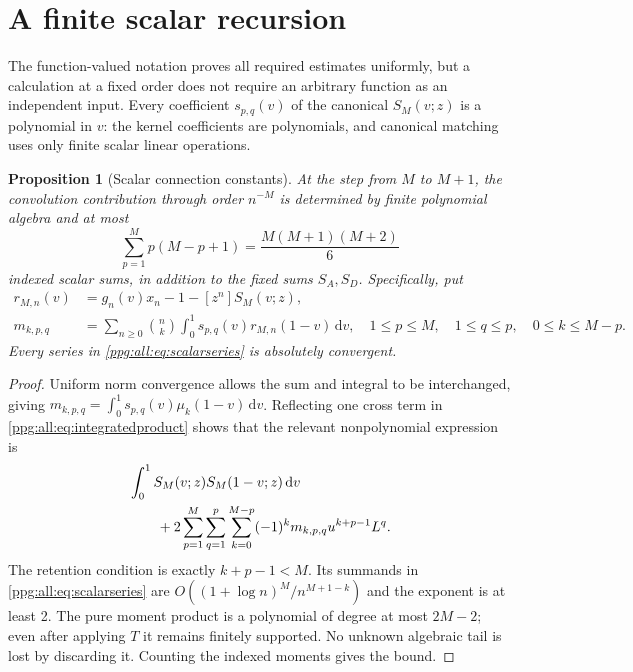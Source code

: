 \documentclass[11pt,letterpaper]{article}
\newtheorem{proposition}[theorem]{Proposition}
\theoremstyle{remark}\newtheorem{remark}[theorem]{Remark}
\numberwithin{equation}{section}
\newcommand{\dd}{\mathrm d}
\begin{document}
\section{A finite scalar recursion}\label{ppg:all:sec:scalar}
The function-valued notation proves all required estimates uniformly, but a calculation at a fixed order does not require an arbitrary function as an independent input. Every coefficient $s_{p,q}(v)$ of the canonical $S_M(v;z)$ is a polynomial in $v$: the kernel coefficients are polynomials, and canonical matching uses only finite scalar linear operations.

\begin{proposition}[Scalar connection constants]\label{ppg:all:prop:scalar}
At the step from $M$ to $M+1$, the convolution contribution through order $n^{-M}$ is determined by finite polynomial algebra and at most
\[
 \sum_{p=1}^M p(M-p+1)=\frac{M(M+1)(M+2)}6
\]
indexed scalar sums, in addition to the fixed sums $S_A,S_D$. Specifically, put
\begin{align}
 r_{M,n}(v)&=g_n(v)x_n-1-[z^n]S_M(v;z),\label{ppg:all:eq:rMn}\\
 m_{k,p,q}&=\sum_{n\ge0}\binom nk\int_0^1s_{p,q}(v)r_{M,n}(1-v)\,\dd v,
 \quad 1\le p\le M,\quad1\le q\le p,\quad0\le k\le M-p.
 \label{ppg:all:eq:scalarseries}
\end{align}
Every series in \eqref{ppg:all:eq:scalarseries} is absolutely convergent.
\end{proposition}
\begin{proof}
Uniform norm convergence allows the sum and integral to be interchanged, giving
$m_{k,p,q}=\int_0^1s_{p,q}(v)\mu_k(1-v)\,\dd v$. Reflecting one cross term in \eqref{ppg:all:eq:integratedproduct} shows that the relevant nonpolynomial expression is
\begin{align}
 &\int_0^1 S_M(v;z)S_M(1-v;z)\,\dd v\notag\\
 &\qquad+2\sum_{p=1}^M\sum_{q=1}^p\sum_{k=0}^{M-p}
       (-1)^km_{k,p,q}u^{k+p-1}L^q.\label{ppg:all:eq:scalarproduct}
\end{align}
The retention condition is exactly $k+p-1<M$. Its summands in \eqref{ppg:all:eq:scalarseries} are $O((1+\log n)^M/n^{M+1-k})$ and the exponent is at least 2. The pure moment product is a polynomial of degree at most $2M-2$; even after applying $T$ it remains finitely supported. No unknown algebraic tail is lost by discarding it. Counting the indexed moments gives the bound.
\end{proof}
\end{document}
